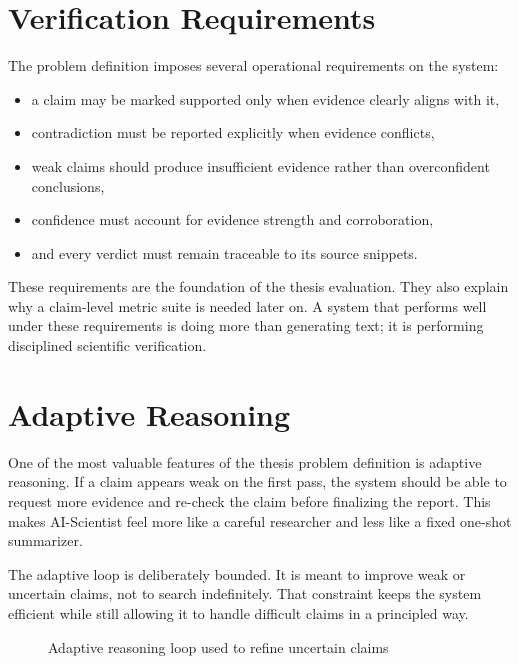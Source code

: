 \section{Verification Requirements}

The problem definition imposes several operational requirements on the system:
\begin{itemize}[leftmargin=*]
    \item a claim may be marked supported only when evidence clearly aligns with it,
    \item contradiction must be reported explicitly when evidence conflicts,
    \item weak claims should produce insufficient evidence rather than overconfident conclusions,
    \item confidence must account for evidence strength and corroboration,
    \item and every verdict must remain traceable to its source snippets.
\end{itemize}

These requirements are the foundation of the thesis evaluation. They also explain why a claim-level metric suite is needed later on. A system that performs well under these requirements is doing more than generating text; it is performing disciplined scientific verification.

\section{Adaptive Reasoning}

One of the most valuable features of the thesis problem definition is adaptive reasoning. If a claim appears weak on the first pass, the system should be able to request more evidence and re-check the claim before finalizing the report. This makes AI-Scientist feel more like a careful researcher and less like a fixed one-shot summarizer.

The adaptive loop is deliberately bounded. It is meant to improve weak or uncertain claims, not to search indefinitely. That constraint keeps the system efficient while still allowing it to handle difficult claims in a principled way.

\begin{figure}[H]
\centering
{}
\caption{Adaptive reasoning loop used to refine uncertain claims}
\label{fig:adaptive_reasoning_loop}
\end{figure}

